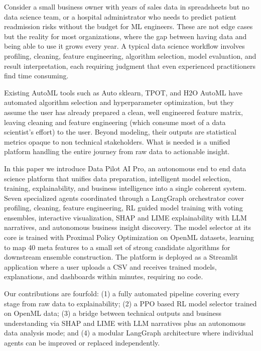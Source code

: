 \documentclass{article}
\begin{document}
Consider a small business owner with years of sales data in spreadsheets but no data science team, or a hospital administrator who needs to predict patient readmission risks without the budget for ML engineers. These are not edge cases but the reality for most organizations, where the gap between having data and being able to use it grows every year. A typical data science workflow involves profiling, cleaning, feature engineering, algorithm selection, model evaluation, and result interpretation, each requiring judgment that even experienced practitioners find time consuming.

Existing AutoML tools such as Auto sklearn, TPOT, and H2O AutoML have automated algorithm selection and hyperparameter optimization, but they assume the user has already prepared a clean, well engineered feature matrix, leaving cleaning and feature engineering (which consume most of a data scientist's effort) to the user. Beyond modeling, their outputs are statistical metrics opaque to non technical stakeholders. What is needed is a unified platform handling the entire journey from raw data to actionable insight.

In this paper we introduce Data Pilot AI Pro, an autonomous end to end data science platform that unifies data preparation, intelligent model selection, training, explainability, and business intelligence into a single coherent system. Seven specialized agents coordinated through a LangGraph orchestrator cover profiling, cleaning, feature engineering, RL guided model training with voting ensembles, interactive visualization, SHAP and LIME explainability with LLM narratives, and autonomous business insight discovery. The model selector at its core is trained with Proximal Policy Optimization on OpenML datasets, learning to map 40 meta features to a small set of strong candidate algorithms for downstream ensemble construction. The platform is deployed as a Streamlit application where a user uploads a CSV and receives trained models, explanations, and dashboards within minutes, requiring no code.

Our contributions are fourfold: (1) a fully automated pipeline covering every stage from raw data to explainability; (2) a PPO based RL model selector trained on OpenML data; (3) a bridge between technical outputs and business understanding via SHAP and LIME with LLM narratives plus an autonomous data analysis mode; and (4) a modular LangGraph architecture where individual agents can be improved or replaced independently.
\end{document}
